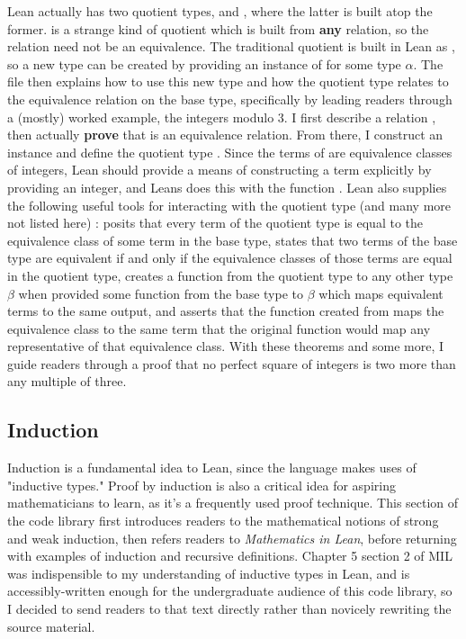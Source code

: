 Lean actually has two quotient types,  and , where the
latter is built atop the former.  is a strange kind of quotient which
is built from \textbf{any} relation, so the relation need not be an equivalence.
The traditional quotient is built in Lean as 
, so a new  type can 
be created by providing an instance of  for some type 
$\alpha$. The file then explains how to use this new type and how the quotient
type relates to the equivalence relation on the base type, specifically by
leading readers through a (mostly) worked example, the integers modulo 3.
I first describe a relation 
, then
actually \textbf{prove} that  is an equivalence relation. From there,
I construct an instance  and define the quotient
type . Since the terms of  are 
equivalence classes of integers, Lean should provide a means of constructing
a term explicitly by providing an integer, and Leans does this with the function
. Lean also 
supplies the following useful tools for interacting with the quotient
type (and many more not listed here) :
 posits that every term of the quotient type is
equal to the equivalence class of some term in the base type, 
 states that two terms of the base type are equivalent if
and only if the equivalence classes of those terms are equal in the quotient type,
 creates a function from the quotient type to any other type 
$\beta$ when provided some function from the base type to $\beta$ which
maps equivalent terms to the same output, and 
 asserts that the function created from 
maps the equivalence class to the same term that the original function would
map any representative of that equivalence class. With these theorems and some more, 
I guide readers through a proof that no perfect square of integers is two more than
any multiple of three.

\subsection{Induction}

Induction is a fundamental idea to Lean, since the language makes uses of
"inductive types." Proof by induction is also a critical idea for aspiring 
mathematicians to learn, as it's a frequently used proof technique. This
section of the code library first introduces readers to the mathematical notions
of strong and weak induction, then refers readers to \textit{Mathematics in Lean},
before returning with examples of induction and recursive definitions. Chapter 
5 section 2 of MIL was indispensible to my understanding of inductive types in 
Lean, and is accessibly-written enough for the undergraduate audience of this
code library, so I decided to send readers to that text directly rather than 
novicely rewriting the source material. 

